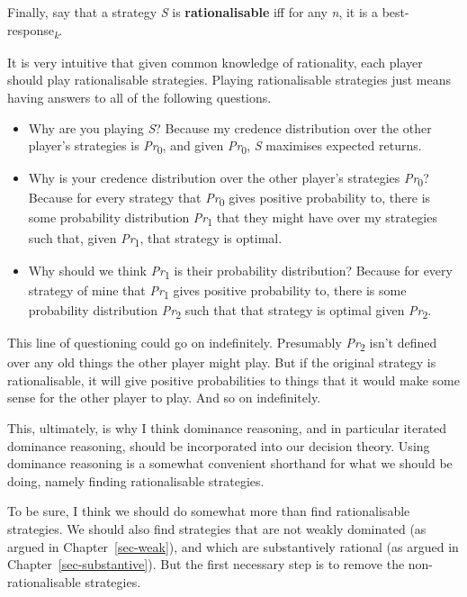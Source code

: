 \documentclass[
  12pt,
  letterpaper,
  DIV=11,
  numbers=noendperiod]{scrreprt}
\providecommand{\tightlist}{%
  \setlength{\itemsep}{0pt}\setlength{\parskip}{0pt}}\usepackage{longtable,booktabs,array}
\begin{document}
Finally, say that a strategy \emph{S} is \textbf{rationalisable} iff for
any \emph{n}, it is a best-response\textsubscript{\emph{k}}.

It is very intuitive that given common knowledge of rationality, each
player should play rationalisable strategies. Playing rationalisable
strategies just means having answers to all of the following questions.

\begin{itemize}
\tightlist
\item
  Why are you playing \emph{S}? Because my credence distribution over
  the other player's strategies is \emph{Pr}\textsubscript{0}, and given
  \emph{Pr}\textsubscript{0}, \emph{S} maximises expected returns.
\item
  Why is your credence distribution over the other player's strategies
  \emph{Pr}\textsubscript{0}? Because for every strategy that
  \emph{Pr}\textsubscript{0} gives positive probability to, there is
  some probability distribution \emph{Pr}\textsubscript{1} that they
  might have over my strategies such that, given
  \emph{Pr}\textsubscript{1}, that strategy is optimal.
\item
  Why should we think \emph{Pr}\textsubscript{1} is their probability
  distribution? Because for every strategy of mine that
  \emph{Pr}\textsubscript{1} gives positive probability to, there is
  some probability distribution \emph{Pr}\textsubscript{2} such that
  that strategy is optimal given \emph{Pr}\textsubscript{2}.
\end{itemize}

This line of questioning could go on indefinitely. Presumably
\emph{Pr}\textsubscript{2} isn't defined over any old things the other
player might play. But if the original strategy is rationalisable, it
will give positive probabilities to things that it would make some sense
for the other player to play. And so on indefinitely.

This, ultimately, is why I think dominance reasoning, and in particular
iterated dominance reasoning, should be incorporated into our decision
theory. Using dominance reasoning is a somewhat convenient shorthand for
what we should be doing, namely finding rationalisable strategies.

To be sure, I think we should do somewhat more than find rationalisable
strategies. We should also find strategies that are not weakly dominated
(as argued in Chapter~\ref{sec-weak}), and which are substantively
rational (as argued in Chapter~\ref{sec-substantive}). But the first
necessary step is to remove the non-rationalisable strategies.
\end{document}
